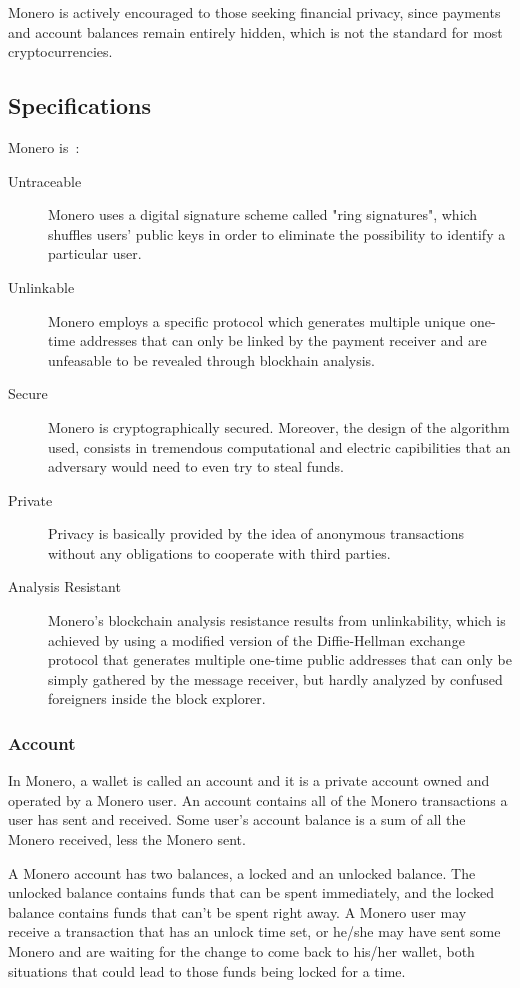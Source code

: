 Monero is actively encouraged to those seeking financial privacy, since payments and account balances remain entirely hidden, which is not the standard for most cryptocurrencies.

\subsection{Specifications}
Monero is~\cite{monero}:
\begin{description}
  \item [Untraceable] Monero uses a digital signature scheme called "ring signatures", which shuffles users' public keys in order to eliminate the possibility to identify a particular user.
  \item [Unlinkable] Monero employs a specific protocol which generates multiple unique one-time addresses that can only be linked by the payment receiver and are unfeasable to be revealed through blockhain analysis.
  \item [Secure] Monero is cryptographically secured. Moreover, the design of the algorithm used, consists in tremendous computational and electric capibilities that an adversary would need to even try to steal funds.
  \item [Private] Privacy is basically provided by the idea of anonymous transactions without any obligations to cooperate with third parties.
  \item [Analysis Resistant] Monero's blockchain analysis resistance results from unlinkability, which is achieved by using a modified version of the Diffie-Hellman exchange protocol that generates multiple one-time public addresses that can only be simply gathered by the message receiver, but hardly analyzed by confused foreigners inside the block explorer.
\end{description}

\subsubsection{Account}
In Monero, a wallet is called an account and it is a private account owned and operated by a Monero user. An account contains all of the Monero transactions a user has sent and received. Some user's account balance is a sum of all the Monero received, less the Monero sent.

A Monero account has two balances, a locked and an unlocked balance. The unlocked balance contains funds that can be spent immediately, and the locked balance contains funds that can't be spent right away. A Monero user may receive a transaction that has an unlock time set, or he/she may have sent some Monero and are waiting for the change to come back to his/her wallet, both situations that could lead to those funds being locked for a time.

